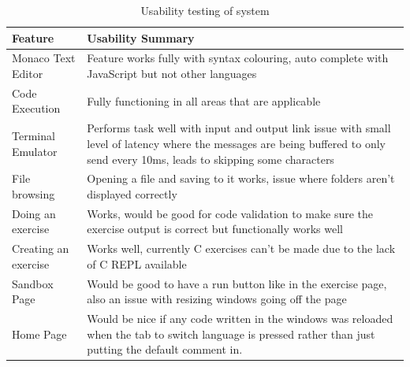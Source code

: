 \begin{table}[h]
    \centering
    \begin{tabulary}{\textwidth}{l|L}
        \hline
        \hline
        \textbf{Feature} & \textbf{Usability Summary}\\
        \hline
        \hline
        Monaco Text Editor & Feature works fully with syntax colouring, auto complete with JavaScript but not other languages\\

        Code Execution & Fully functioning in all areas that are applicable\\

        Terminal Emulator & Performs task well with input and output link issue with small level of latency where the messages are being buffered to only send every 10ms, leads to skipping some characters\\

        File browsing & Opening a file and saving to it works, issue where folders aren't displayed correctly\\

        Doing an exercise & Works, would be good for code validation to make sure the exercise output is correct but functionally works well\\

        Creating an exercise & Works well, currently C exercises can't be made due to the lack of C REPL available\\

        Sandbox Page & Would be good to have a run button like in the exercise page, also an issue with resizing windows going off the page\\

        Home Page & Would be nice if any code written in the windows was reloaded when the tab to switch language is pressed rather than just putting the default comment in.\\
    \end{tabulary}
    \caption{Usability testing of system}
\end{table}







